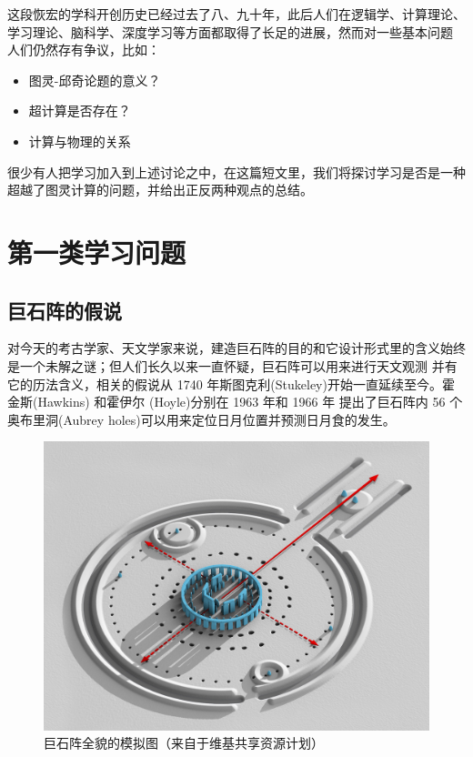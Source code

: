 \documentclass[a4paper,12pt]{article}
\numberwithin{problem}{section}
\numberwithin{definition}{section}
\numberwithin{lemma}{section}
\numberwithin{proposition}{section}
\numberwithin{theorem}{section}
\numberwithin{grammar}{section}
\numberwithin{program}{section}
\numberwithin{convention}{section}
\numberwithin{corollary}{section}
\begin{document}
这段恢宏的学科开创历史已经过去了八、九十年，此后人们在逻辑学、计算理论、学习理论、脑科学、深度学习等方面都取得了长足的进展，然而对一些基本问题
人们仍然存有争议，比如：
\begin{itemize}
    \item 图灵-邱奇论题的意义？\cite{Boker2020WhatIT}
    \item 超计算是否存在？\cite{Copeland2004Hypercomputation}
    \item 计算与物理的关系\cite{Copeland2018CTT}
\end{itemize}

很少有人把学习加入到上述讨论之中，在这篇短文里，我们将探讨学习是否是一种超越了图灵计算的问题，并给出正反两种观点的总结。

\section{第一类学习问题}

\subsection{巨石阵的假说}

对今天的考古学家、天文学家来说，建造巨石阵的目的和它设计形式里的含义始终是一个未解之谜；但人们长久以来一直怀疑，巨石阵可以用来进行天文观测
并有它的历法含义，相关的假说从 1740 年斯图克利(Stukeley)开始一直延续至今。霍金斯(Hawkins) 和霍伊尔 (Hoyle)分别在 1963 年和 1966 年
提出了巨石阵内 56 个奥布里洞(Aubrey holes)可以用来定位日月位置并预测日月食的发生。\cite{Herten2018FunctionalPO}

\begin{figure}[ht]
\centering
\includegraphics[width=5.0in]{images/Stonehenge_render.jpeg}
\caption{巨石阵全貌的模拟图（来自于维基共享资源计划）}
\end{figure}
\end{document}
